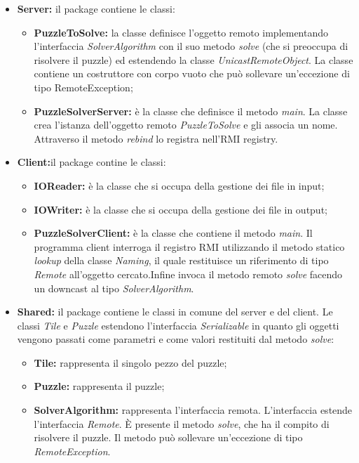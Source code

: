\documentclass[13pt]{article}
\begin{document}
\begin{itemize}
	\item \textbf{Server: }il package contiene le classi:
		\begin{itemize}
			\item \textbf{PuzzleToSolve:} la classe definisce l'oggetto remoto implementando l'interfaccia \textit{SolverAlgorithm} con il suo metodo \textit{solve} (che si preoccupa di risolvere il puzzle)  ed estendendo la classe \textit{UnicastRemoteObject}. La classe contiene un costruttore con corpo vuoto che può sollevare un'eccezione di tipo RemoteException;
			\item \textbf{PuzzleSolverServer: }è la classe che definisce il metodo \textit{main}. La classe crea l'istanza dell'oggetto remoto \textit{PuzzleToSolve} e gli associa un nome. Attraverso il metodo \textit{rebind} lo registra nell'RMI registry.
		\end{itemize}
	\item \textbf{Client:}il package contine le classi:
		\begin{itemize}
			\item \textbf{IOReader: }è la classe che si occupa della gestione dei file in input;
			\item \textbf{IOWriter: }è la classe che si occupa della gestione dei file in output;
			\item \textbf{PuzzleSolverClient: }è la classe che contiene il metodo \textit{main}. Il programma client interroga il registro RMI utilizzando il metodo statico \textit{lookup} della classe \textit{Naming}, il quale restituisce un riferimento di tipo \textit{Remote} all'oggetto cercato.Infine invoca il metodo remoto \textit{solve} facendo un downcast al tipo \textit{SolverAlgorithm}.
		\end{itemize}
	\item \textbf{Shared:} il package contiene le classi in comune del server e del client. Le classi \textit{Tile} e \textit{Puzzle} estendono l'interfaccia \textit{Serializable} in quanto gli oggetti vengono passati come parametri e come valori restituiti dal metodo \textit{solve}:
		\begin{itemize}
			\item \textbf{Tile:} rappresenta il singolo pezzo del puzzle;
			\item \textbf{Puzzle:} rappresenta il puzzle;
			\item \textbf{SolverAlgorithm:} rappresenta l'interfaccia remota. L'interfaccia estende l'interfaccia \textit{Remote}. È presente il metodo \textit{solve}, che ha il compito di risolvere il puzzle. Il metodo può sollevare un'eccezione di tipo \textit{RemoteException}.
		\end{itemize}
\end{itemize}
\end{document}

